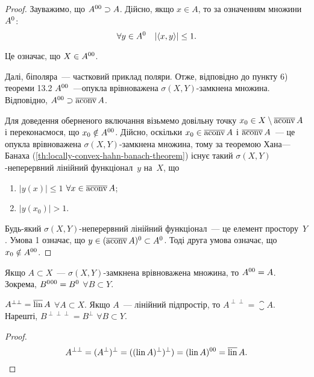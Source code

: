 \begin{proof}
    Зауважимо, що $A^{00} \supset A$. Дійсно, якщо $x \in A$, то за означенням множини~$A^0$:
    \begin{equation*}
        \forall y \in A^0 \quad |\langle x, y \rangle| \le 1.
    \end{equation*}

    Це означає, що $X \in A^{00}$.

    Далі, біполяра~--- частковий приклад поляри. Отже, відповідно до пункту 6) теореми 13.2 $A^{00}$~---опукла врівноважена $\sigma(X, Y)$-замкнена множина. Відповідно, $A^{00} \supset \operatorname{\overline{aconv}} A$.
    
    Для доведення оберненого включання візьмемо довільну точку $x_0 \in X \setminus \operatorname{\overline{aconv}} A$ і переконаємося, що $x_0 \notin A^{00}$. Дійсно, оскільки $x_0 \in \operatorname{\overline{aconv}} A$ і $\operatorname{\overline{aconv}} A$~--- це опукла врівноважена $\sigma(X, Y)$-замкнена множина, тому за теоремою Хана---Банаха (\cref{th:locally-convex-hahn-banach-theorem}) існує такий $\sigma(X, Y)$-неперервний лінійний функціонал~$y$ на~$X$, що
    \begin{enumerate}
        \item $|y(x)| \le 1$ $\forall x \in \operatorname{\overline{aconv}} A$;
        \item $|y(x_0)| > 1$.
    \end{enumerate}

    Будь-який $\sigma(X, Y)$-неперервний лінійний функціонал~--- це елемент простору~$Y$. Умова 1 означає, що $y \in (\operatorname{\overline{aconv}} A)^0 \subset A^0$. Тоді друга умова означає, що $x_0 \notin A^{00}$.
\end{proof}

\begin{corollary}
    Якщо $A \subset X$~--- $\sigma(X, Y)$-замкнена врівноважена множина, то $A^{00} = A$. Зокрема, $B^0{}^{00} = B^0$ $\forall B \subset Y$.
\end{corollary}

\begin{corollary}
    $A^{\perp\perp} = \operatorname{\overline{lin}} A$ $\forall A \subset X$. Якщо $A$~--- лінійний підпростір, то $A^{\perp\perp} = \closure A$. Нарешті, $B^{\perp\perp\perp} = B^\perp$ $\forall B \subset Y$.
\end{corollary}

\begin{proof}
    \begin{equation*}
        A^{\perp\perp} = (A^\perp)^\perp = ((\operatorname{lin} A)^\perp)^\perp) = (\operatorname{lin} A)^{00} = \operatorname{\overline{lin}} A. \qedhere
    \end{equation*}
\end{proof}

